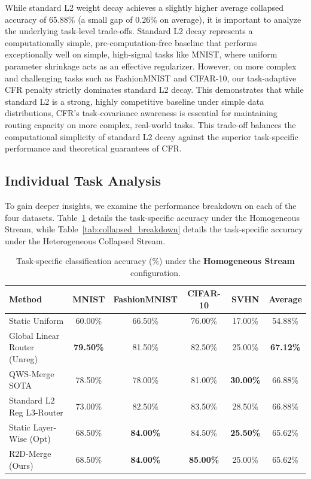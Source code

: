 While standard L2 weight decay achieves a slightly higher average collapsed accuracy of 65.88\% (a small gap of 0.26\% on average), it is important to analyze the underlying task-level trade-offs. Standard L2 decay represents a computationally simple, pre-computation-free baseline that performs exceptionally well on simple, high-signal tasks like MNIST, where uniform parameter shrinkage acts as an effective regularizer. However, on more complex and challenging tasks such as FashionMNIST and CIFAR-10, our task-adaptive CFR penalty strictly dominates standard L2 decay. This demonstrates that while standard L2 is a strong, highly competitive baseline under simple data distributions, CFR's task-covariance awareness is essential for maintaining routing capacity on more complex, real-world tasks. This trade-off balances the computational simplicity of standard L2 decay against the superior task-specific performance and theoretical guarantees of CFR.

\subsection{Individual Task Analysis}
To gain deeper insights, we examine the performance breakdown on each of the four datasets. Table~\ref{tab:homogeneous_breakdown} details the task-specific accuracy under the Homogeneous Stream, while Table~\ref{tab:collapsed_breakdown} details the task-specific accuracy under the Heterogeneous Collapsed Stream.

\begin{table}[t]
\caption{Task-specific classification accuracy (\%) under the \textbf{Homogeneous Stream} configuration.}
\label{tab:homogeneous_breakdown}
\vskip 0.15in
\begin{center}
\begin{small}
\begin{sc}
\begin{tabular}{lccccc}
\toprule
Method & MNIST & FashionMNIST & CIFAR-10 & SVHN & Average \\
\midrule
Static Uniform & 60.00\% & 66.50\% & 76.00\% & 17.00\% & 54.88\% \\
Global Linear Router (Unreg) & \textbf{79.50\%} & 81.50\% & 82.50\% & 25.00\% & \textbf{67.12\%} \\
QWS-Merge SOTA & 78.50\% & 78.00\% & 81.00\% & \textbf{30.00\%} & 66.88\% \\
Standard L2 Reg L3-Router & 73.00\% & 82.50\% & 83.50\% & 28.50\% & 66.88\% \\
Static Layer-Wise (Opt) & 68.50\% & \textbf{84.00\%} & 84.50\% & \textbf{25.50\%} & 65.62\% \\
R2D-Merge (Ours) & 68.50\% & \textbf{84.00\%} & \textbf{85.00\%} & 25.00\% & 65.62\% \\
\bottomrule
\end{tabular}
\end{sc}
\end{small}
\end{center}
\vskip -0.1in
\end{table}


